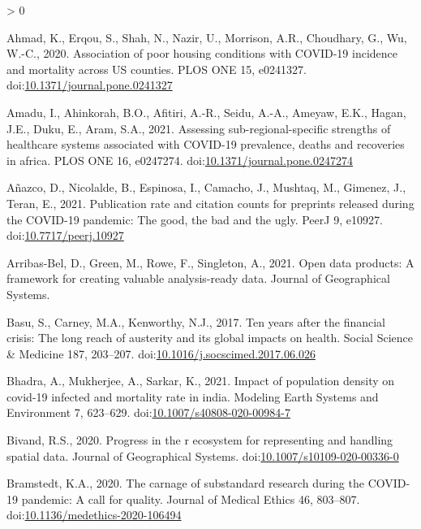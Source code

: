 \documentclass[]{elsarticle} %
\newlength{\cslhangindent}
\newenvironment{CSLReferences}[2] %
 {%
  \setlength{\parindent}{0pt}
  \ifodd #1 \everypar{\setlength{\hangindent}{\cslhangindent}}\ignorespaces\fi
  \ifnum #2 > 0
  \setlength{\parskip}{#2\baselineskip}
  \fi
 }%
 {}
\begin{document}
\hypertarget{refs}{}
\begin{CSLReferences}{1}{0}
\leavevmode\hypertarget{ref-Ahmad2020association}{}%
Ahmad, K., Erqou, S., Shah, N., Nazir, U., Morrison, A.R., Choudhary,
G., Wu, W.-C., 2020. Association of poor housing conditions with
COVID-19 incidence and mortality across US counties. PLOS ONE 15,
e0241327.
doi:\href{https://doi.org/10.1371/journal.pone.0241327}{10.1371/journal.pone.0241327}

\leavevmode\hypertarget{ref-Amadu2021assessing}{}%
Amadu, I., Ahinkorah, B.O., Afitiri, A.-R., Seidu, A.-A., Ameyaw, E.K.,
Hagan, J.E., Duku, E., Aram, S.A., 2021. Assessing sub-regional-specific
strengths of healthcare systems associated with COVID-19 prevalence,
deaths and recoveries in africa. PLOS ONE 16, e0247274.
doi:\href{https://doi.org/10.1371/journal.pone.0247274}{10.1371/journal.pone.0247274}

\leavevmode\hypertarget{ref-Anazco2021publication}{}%
Añazco, D., Nicolalde, B., Espinosa, I., Camacho, J., Mushtaq, M.,
Gimenez, J., Teran, E., 2021. Publication rate and citation counts for
preprints released during the COVID-19 pandemic: The good, the bad and
the ugly. PeerJ 9, e10927.
doi:\href{https://doi.org/10.7717/peerj.10927}{10.7717/peerj.10927}

\leavevmode\hypertarget{ref-Arribas2021open}{}%
Arribas-Bel, D., Green, M., Rowe, F., Singleton, A., 2021. Open data
products: A framework for creating valuable analysis-ready data. Journal
of Geographical Systems.

\leavevmode\hypertarget{ref-Basu2017ten}{}%
Basu, S., Carney, M.A., Kenworthy, N.J., 2017. Ten years after the
financial crisis: The long reach of austerity and its global impacts on
health. Social Science \& Medicine 187, 203--207.
doi:\href{https://doi.org/10.1016/j.socscimed.2017.06.026}{10.1016/j.socscimed.2017.06.026}

\leavevmode\hypertarget{ref-Bhadra2021impact}{}%
Bhadra, A., Mukherjee, A., Sarkar, K., 2021. Impact of population
density on covid-19 infected and mortality rate in india. Modeling Earth
Systems and Environment 7, 623--629.
doi:\href{https://doi.org/10.1007/s40808-020-00984-7}{10.1007/s40808-020-00984-7}

\leavevmode\hypertarget{ref-Bivand2020progress}{}%
Bivand, R.S., 2020. Progress in the r ecosystem for representing and
handling spatial data. Journal of Geographical Systems.
doi:\href{https://doi.org/10.1007/s10109-020-00336-0}{10.1007/s10109-020-00336-0}

\leavevmode\hypertarget{ref-Bramstedt2020carnage}{}%
Bramstedt, K.A., 2020. The carnage of substandard research during the
COVID-19 pandemic: A call for quality. Journal of Medical Ethics 46,
803--807.
doi:\href{https://doi.org/10.1136/medethics-2020-106494}{10.1136/medethics-2020-106494}


\end{CSLReferences}
\end{document}
